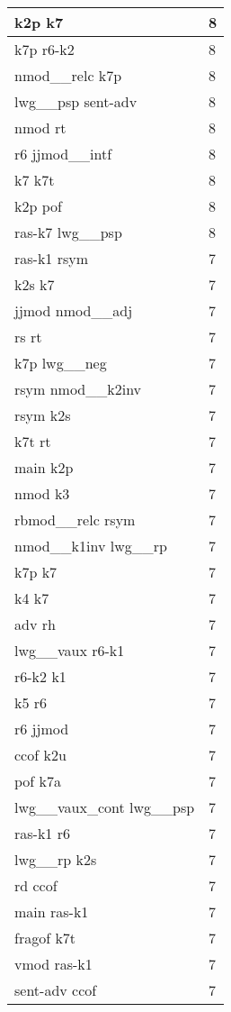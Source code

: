 \documentclass[a4 paper]{article}
\begin{document}
\begin{longtable}{p{}p{}}
k2p k7  & 8 \\ \midrule
k7p r6-k2  & 8 \\ \midrule
nmod\_\_relc k7p  & 8 \\ \midrule
lwg\_\_psp sent-adv  & 8 \\ \midrule
nmod rt  & 8 \\ \midrule
r6 jjmod\_\_intf  & 8 \\ \midrule
k7 k7t  & 8 \\ \midrule
k2p pof  & 8 \\ \midrule
ras-k7 lwg\_\_psp  & 8 \\ \midrule
ras-k1 rsym  & 7 \\ \midrule
k2s k7  & 7 \\ \midrule
jjmod nmod\_\_adj  & 7 \\ \midrule
rs rt  & 7 \\ \midrule
k7p lwg\_\_neg  & 7 \\ \midrule
rsym nmod\_\_k2inv  & 7 \\ \midrule
rsym k2s  & 7 \\ \midrule
k7t rt  & 7 \\ \midrule
main k2p  & 7 \\ \midrule
nmod k3  & 7 \\ \midrule
rbmod\_\_relc rsym  & 7 \\ \midrule
nmod\_\_k1inv lwg\_\_rp  & 7 \\ \midrule
k7p k7  & 7 \\ \midrule
k4 k7  & 7 \\ \midrule
adv rh  & 7 \\ \midrule
lwg\_\_vaux r6-k1  & 7 \\ \midrule
r6-k2 k1  & 7 \\ \midrule
k5 r6  & 7 \\ \midrule
r6 jjmod  & 7 \\ \midrule
ccof k2u  & 7 \\ \midrule
pof k7a  & 7 \\ \midrule
lwg\_\_vaux\_cont lwg\_\_psp  & 7 \\ \midrule
ras-k1 r6  & 7 \\ \midrule
lwg\_\_rp k2s  & 7 \\ \midrule
rd ccof  & 7 \\ \midrule
main ras-k1  & 7 \\ \midrule
fragof k7t  & 7 \\ \midrule
vmod ras-k1  & 7 \\ \midrule
sent-adv ccof  & 7 \\ \midrule

\end{longtable}
\end{document}
